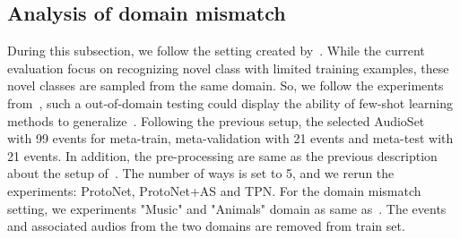 \documentclass[a4paper]{article}
\begin{document}
\subsection{Analysis of domain mismatch}
\vspace{-1mm}
During this subsection, we follow the setting created by~\cite{fewshotdomain}. While the current evaluation focus on recognizing novel class with limited training examples, these novel classes are sampled from the same domain. So, we follow the experiments from~\cite{fewshotdomain}, such a out-of-domain testing could display the ability of few-shot learning methods to generalize~\cite{domainad,domain_ad}. Following the previous setup, the selected AudioSet~\cite{audioSet} with 99 events for meta-train, meta-validation with 21 events and meta-test with 21 events. In addition, the pre-processing are same as the previous description about the setup of~\cite{attentionSimilarity}. The number of ways is set to 5, and we rerun the experiments: ProtoNet, ProtoNet+AS and TPN. For the domain mismatch setting, we experiments "Music" and "Animals" domain as same as~\cite{fewshotdomain}. The events and associated audios from the two domains are removed from train set.
\end{document}

